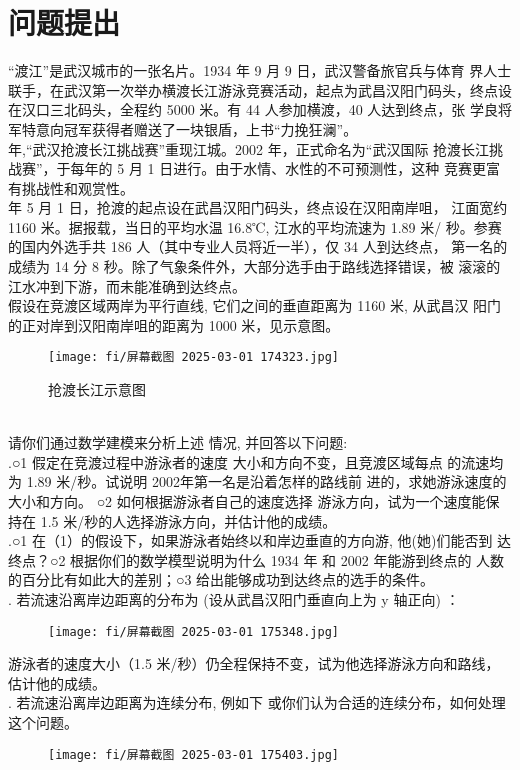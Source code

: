 \documentclass{article}
\begin{document}
\section{问题提出}
“渡江”是武汉城市的一张名片。1934 年 9 月 9 日，武汉警备旅官兵与体育
界人士联手，在武汉第一次举办横渡长江游泳竞赛活动，起点为武昌汉阳门码头，终点设在汉口三北码头，全程约 5000 米。有 44 人参加横渡，40 人达到终点，张
学良将军特意向冠军获得者赠送了一块银盾，上书“力挽狂澜”。
\\  年,“武汉抢渡长江挑战赛”重现江城。2002 年，正式命名为“武汉国际
抢渡长江挑战赛”，于每年的 5 月 1 日进行。由于水情、水性的不可预测性，这种
竞赛更富有挑战性和观赏性。
\\  年 5 月 1 日，抢渡的起点设在武昌汉阳门码头，终点设在汉阳南岸咀，
江面宽约 1160 米。据报载，当日的平均水温 16.8℃, 江水的平均流速为 1.89 米/
秒。参赛的国内外选手共 186 人（其中专业人员将近一半），仅 34 人到达终点，
第一名的成绩为 14 分 8 秒。除了气象条件外，大部分选手由于路线选择错误，被
滚滚的江水冲到下游，而未能准确到达终点。
\\ \indent 假设在竞渡区域两岸为平行直线, 它们之间的垂直距离为 1160 米, 从武昌汉
阳门的正对岸到汉阳南岸咀的距离为 1000 米，见示意图。
\begin{figure}[h]
    \centering
    \texttt{[image: fi/屏幕截图 2025-03-01 174323.jpg]}
    \caption{抢渡长江示意图}
    \label{fig:framework_comparison}
\end{figure}
\\ \indent 请你们通过数学建模来分析上述
情况, 并回答以下问题:
\\ .○1 假定在竞渡过程中游泳者的速度
大小和方向不变，且竞渡区域每点
的流速均为 1.89 米/秒。试说明
2002年第一名是沿着怎样的路线前
进的，求她游泳速度的大小和方向。
○2 如何根据游泳者自己的速度选择
游泳方向，试为一个速度能保持在
1.5 米/秒的人选择游泳方向，并估计他的成绩。
\\ .○1 在（1）的假设下，如果游泳者始终以和岸边垂直的方向游, 他(她)们能否到
达终点？○2 根据你们的数学模型说明为什么 1934 年 和 2002 年能游到终点的
人数的百分比有如此大的差别；○3 给出能够成功到达终点的选手的条件。
\\ . 若流速沿离岸边距离的分布为 (设从武昌汉阳门垂直向上为 y 轴正向) ：
\begin{figure}[h]
    \centering
    \texttt{[image: fi/屏幕截图 2025-03-01 175348.jpg]}
\end{figure} 
游泳者的速度大小（1.5 米/秒）仍全程保持不变，试为他选择游泳方向和路线，
估计他的成绩。
\\ . 若流速沿离岸边距离为连续分布, 例如下 或你们认为合适的连续分布，如何处理这个问题。
\begin{figure}[h]
    \centering
    \texttt{[image: fi/屏幕截图 2025-03-01 175403.jpg]}
\end{figure} 
\end{document}
